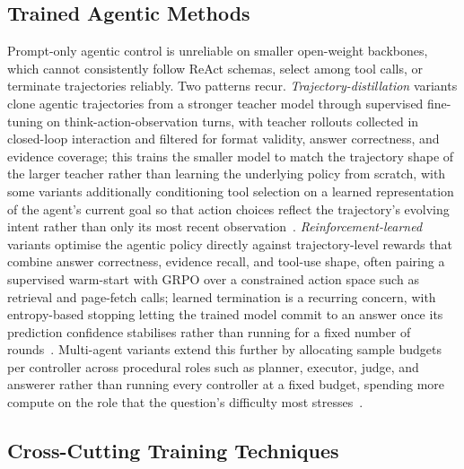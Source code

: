 \documentclass[11pt]{article}
\begin{document}
\subsection{Trained Agentic Methods}
\label{sec:train-agentic}
Prompt-only agentic control is unreliable on smaller open-weight backbones, which cannot consistently follow ReAct schemas, select among tool calls, or terminate trajectories reliably. Two patterns recur. \textit{Trajectory-distillation} variants clone agentic trajectories from a stronger teacher model through supervised fine-tuning on think-action-observation turns, with teacher rollouts collected in closed-loop interaction and filtered for format validity, answer correctness, and evidence coverage; this trains the smaller model to match the trajectory shape of the larger teacher rather than learning the underlying policy from scratch, with some variants additionally conditioning tool selection on a learned representation of the agent's current goal so that action choices reflect the trajectory's evolving intent rather than only its most recent observation~\cite{zhang2026docdancer}. \textit{Reinforcement-learned} variants optimise the agentic policy directly against trajectory-level rewards that combine answer correctness, evidence recall, and tool-use shape, often pairing a supervised warm-start with GRPO over a constrained action space such as retrieval and page-fetch calls; learned termination is a recurring concern, with entropy-based stopping letting the trained model commit to an answer once its prediction confidence stabilises rather than running for a fixed number of rounds~\cite{zheng2026docv}. Multi-agent variants extend this further by allocating sample budgets per controller across procedural roles such as planner, executor, judge, and answerer rather than running every controller at a fixed budget, spending more compute on the role that the question's difficulty most stresses~\cite{yu2025mact}.

\subsection{Cross-Cutting Training Techniques} 
\label{sec:train-crosscutting}
\end{document}
